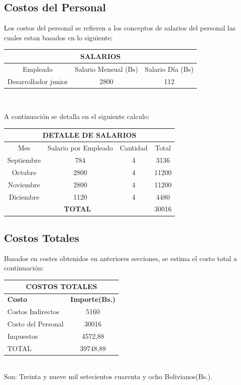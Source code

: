 \documentclass[11pt,letterpaper]{report}
\begin{document}
\subsection{Costos del Personal}
Los costos del personal se refieren a los conceptos de salarios del personal las cuales estan basados en lo siguiente:\\
\begin{center}
	\begin{tabular}{|c|c|c|}
		\hline
		\multicolumn{3}{|c|}{SALARIOS}\\ \hline
		Empleado & Salario Mensual (Bs)	& Salario Día (Bs) \\ \hline
		Desarrollador junior & 2800 & 112 \\ \hline
	\end{tabular} \\ 
\end{center} 
A continuación se detalla en el siguiente calculo:\\
\begin{center}
	\begin{tabular}{|c|c|c|c|}
		\hline
		\multicolumn{4}{|c|}{DETALLE DE SALARIOS} \\ \hline
		Mes & Salario por Empleado & Cantidad & Total \\ \hline
		Septiembre	& 784	& 4	& 3136 \\ \hline
		Octubre	& 2800	& 4	& 11200 \\ \hline
		Noviembre	& 2800	& 4	& 11200 \\ \hline
		Diciembre	& 1120	& 4	& 4480 \\ \hline
		\multicolumn{3}{|c|}{\textbf{TOTAL}} & 30016 \\ \hline
	\end{tabular}
\end{center}
\subsection{Costos Totales}
Basados en costes obtenidos en anteriores secciones, se estima el costo total a continuación: \\
\begin{center}
	\begin{tabular}{|l|c|}
		\hline
		\multicolumn{2}{|c|}{COSTOS TOTALES} \\ \hline
		\textbf{Costo} 	& \textbf{Importe(Bs.)}\\ \hline
		Costos Indirectos	& 5160 \\ \hline
		Costo del Personal	& 30016 \\ \hline
		Impuestos	& 4572,88 \\ \hline
		TOTAL & 39748,88 \\ \hline
	\end{tabular} \\
	Son: Treinta y nueve mil setecientos cuarenta y ocho Bolivianos(Bs.). \\
\end{center}
\end{document}
